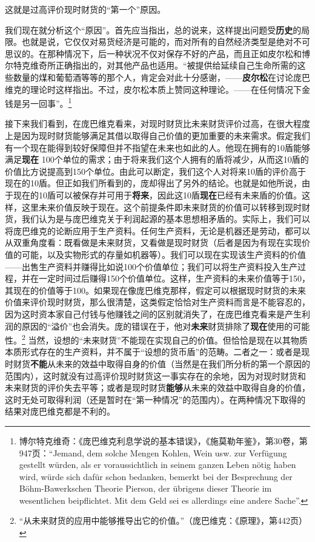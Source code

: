 \documentclass[fontset=fandol, a4paper, 12pt, openright]{ctexbook}
\begin{document}
这就是过高评价现时财货的“第一个”原因。

我们现在就分析这个“原因”。首先应当指出，总的说来，这样提出问题受\textbf{历史}的局限。也就是说，它仅仅对易货经济是可能的，而对所有的自然经济类型是绝对不可思议的。在那种情况下，后一种状况不仅对保存不好的产品，而且正如皮尔松和博尔特克维奇所正确指出的，对其他产品也适用。“被提供给延续自己生命所需的这些数量的煤和葡萄酒等等的那个人，肯定会对此十分感谢，——\textbf{皮尔松}在讨论庞巴维克的理论时这样指出。不过，皮尔松本质上赞同这种理论。——在任何情况下金钱是另一回事”。\footnote{博尔特克维奇：《庞巴维克利息学说的基本错误》，《施莫勒年鉴》，第30卷，第947页：“Jemand, dem solche Mengen Kohlen, Wein usw. zur Verf\"{u}gung gestellt w\"{u}rden, als er voraussichtlich in seinem ganzen Leben n\"{o}tig haben wird, w\"{u}rde sich daf\"{u}r schon bedanken, bemerkt bei der Besprechung der B\"{o}hm-Bawerkschen Theorie Pierson, der \"{u}brigens dieser Theorie im wesentlichen beipflichtet. Mit dem Geld sei es allerdings eine andere Sache''.}

接下来我们看到，在庞巴维克看来，对现时财货比未来财货评价过高，在很大程度上是因为现时财货能够满足其借以取得自己价值的更加重要的未来需求。假定我们有一个现在能得到较好保障但并不指望在未来也如此的人。他现在拥有的10盾能够满足\textbf{现在} 100个单位的需求；由于将来我们这个人拥有的盾将减少，从而这10盾的价值比方说提高到150个单位。由此可以断定，我们这个人对将来10盾的评价高于现在的10盾。但正如我们所看到的，庞却得出了另外的结论。也就是如他所说，由于现在的10盾可以被保存并可用于\textbf{将来}，因此这10盾\textbf{现在}已经有未来盾的价值。这样，这里未来价值反映于现在。这个前提条件即未来财货的价值可以转移到现时财货，我们认为是与庞巴维克关于利润起源的基本思想相矛盾的。实际上，我们可以将庞巴维克的论断应用于生产资料。任何生产资料，无论是机器还是劳动，都可以从双重角度看：既看做是未来财货，又看做是现时财货（后者是因为有现在实现价值的可能，以及实物形式的存量如机器等）。我们可以现在实现该生产资料的价值——出售生产资料并赚得比如说100个价值单位；我们可以将生产资料投入生产过程，并在一定时间过后赚得150个价值单位。这样，生产资料的未来价值等于150，其现在的价值等于100。如果现在像庞巴维克那样，假定可以根据现时财货的未来价值来评价现时财货，那么很清楚，这类假定恰恰对生产资料而言是不能容忍的，因为这时资本家自己付钱与他赚钱之间的区别就消失了，在庞巴维克看来是产生利润的原因的“溢价”也会消失。庞的错误在于，他对\textbf{未来}财货排除了\textbf{现在}使用的可能性。\footnote{“从未来财货的应用中能够推导出它的价值。”（庞巴维克：《原理》，第442页）} 当然，设想的“未来财货”不能现在实现自己的价值。但恰恰是现在以其物质本质形式存在的生产资料，并不属于“设想的货币盾”的范畴。二者之一：或者是现时财货\textbf{不能}从未来的效益中取得自身的价值（当然是在我们所分析的第一个原因的范围内），这时就没有过高评价现时财货这一事实存在的余地，因为对现时财货和未来财货的评价失去平等；或者是现时财货\textbf{能够}从未来的效益中取得自身的价值，这时无处可取得利润（还是暂时在“第一种情况”的范围内）。在两种情况下取得的结果对庞巴维克都是不利的。
\end{document}
